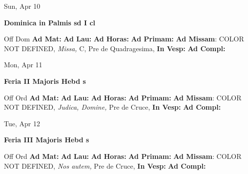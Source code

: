 \documentclass[10pt]{memoir}
\begin{document}
\begin{center}
\begin{minipage}{3.5in}
\vspace{2em}
\begin{center}Sun, Apr 10
\end{center}
\textbf{ \large Dominica in Palmis
\textnormal{\normalsize sd I cl}}

\begin{justify}Off Dom
\textbf{Ad Mat: }
\textbf{Ad Lau: }
\textbf{Ad Horas: }
\textbf{Ad Primam: }\textbf{Ad Missam}: COLOR NOT DEFINED, \textit{Missa,} C, Pre de Quadragesima, 
\textbf{In Vesp: }
\textbf{Ad Compl: }
\end{justify}
\end{minipage}
\end{center}

\begin{center}
\begin{minipage}{3.5in}
\vspace{2em}
\begin{center}Mon, Apr 11
\end{center}
\textbf{ \large Feria II Majoris Hebd
\textnormal{\normalsize s}}

\begin{justify}Off Ord
\textbf{Ad Mat: }
\textbf{Ad Lau: }
\textbf{Ad Horas: }
\textbf{Ad Primam: }\textbf{Ad Missam}: COLOR NOT DEFINED, \textit{Judica, Domine,} Pre de Cruce, 
\textbf{In Vesp: }
\textbf{Ad Compl: }
\end{justify}
\end{minipage}
\end{center}

\begin{center}
\begin{minipage}{3.5in}
\vspace{2em}
\begin{center}Tue, Apr 12
\end{center}
\textbf{ \large Feria III Majoris Hebd
\textnormal{\normalsize s}}

\begin{justify}Off Ord
\textbf{Ad Mat: }
\textbf{Ad Lau: }
\textbf{Ad Horas: }
\textbf{Ad Primam: }\textbf{Ad Missam}: COLOR NOT DEFINED, \textit{Nos autem,} Pre de Cruce, 
\textbf{In Vesp: }
\textbf{Ad Compl: }
\end{justify}
\end{minipage}
\end{center}
\end{document}
